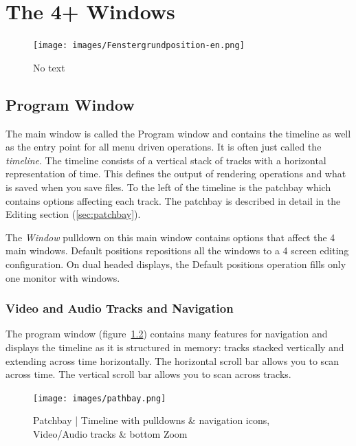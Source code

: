 \chapter{The 4+ Windows}%
\label{cha:the_4_windows}

\begin{figure}[htpb]
    \centering
    \texttt{[image: images/Fenstergrundposition-en.png]}
    \captionsetup{labelformat=empty, textformat=empty}
    \caption[The four windows (cc-by-sa Olaf)]{No text}    
    \label{fig:Fenstergrundposition-en}
\end{figure}

\section{Program Window}%
\label{sec:program_window}

The main window is called the Program window and contains the timeline as well as the entry point for all menu driven operations.  
It is often just called the \textit{timeline}.  
The timeline consists of a vertical stack of tracks with a horizontal representation of time. 
This defines the output of rendering operations and what is saved when you save files. 
To the left of the timeline is the patchbay which contains options affecting each track.  
The patchbay is described in detail in the Editing section (\ref{sec:patchbay}).

The \textit{Window} pulldown on this main window contains options that affect the 4 main windows. 
Default positions repositions all the windows to a 4 screen editing configuration.
On dual headed displays,
the Default positions operation fills only one monitor with windows.

\subsection{Video and Audio Tracks and Navigation}%
\label{sub:video_and_audio_tracks_and_navigation}

The program window (figure~\ref{fig:pathbay})   contains many features for navigation and displays the timeline as it is structured in memory: tracks stacked vertically and extending across time horizontally. 
The horizontal scroll bar allows you to scan across time. 
The vertical scroll bar allows you to scan across tracks.

\begin{figure}[htpb]
    \centering
    \texttt{[image: images/pathbay.png]}
    \caption{Patchbay  | Timeline with pulldowns \& navigation icons, Video/Audio tracks \& bottom Zoom}
    \label{fig:pathbay}
\end{figure}


